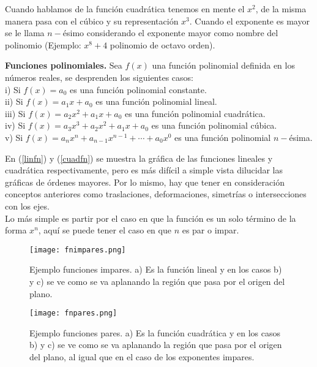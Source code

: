 Cuando hablamos de la función cuadrática tenemos en mente el $x^{2}$, de la misma manera pasa con el cúbico y su representación $x^{3}$. Cuando el exponente es mayor se le llama $n-$ésimo considerando el exponente mayor como nombre del polinomio (Ejemplo: $x^{8}+4$ polinomio de octavo orden). 

\begin{mydef}
\textbf{Funciones polinomiales.} Sea $f(x)$ una función polinomial definida en los números reales, se desprenden los siguientes casos:\\

\noindent i) Si $f(x)=a_{0}$ es una función polinomial constante.\\
\noindent ii) Si $f(x)=a_{1}x+a_{0}$ es una función polinomial lineal.\\
\noindent iii) Si $f(x)=a_{2}x^{2}+a_{1}x+a_{0}$ es una función polinomial cuadrática.\\
\noindent iv) Si $f(x)=a_{3}x^{3}+a_{2}x^{2}+a_{1}x+a_{0}$ es una función polinomial cúbica.\\
\noindent v) Si $f(x)=a_{n}x^{n}+a_{n-1}x^{n-1}+\cdots+a_{0}x^{0}$ es una función polinomial $n-$ésima.
\end{mydef}

En (\ref{linfn}) y (\ref{cuadfn}) se muestra la gráfica de las funciones lineales y cuadrática respectivamente, pero es más difícil a simple vista dilucidar las gráficas de órdenes mayores. Por lo mismo, hay que tener en consideración conceptos anteriores como traslaciones, deformaciones, simetrías o intersecciones con los ejes. \\

Lo más simple es partir por el caso en que la función es un solo término de la forma $x^{n}$, aquí se puede tener el caso en que $n$ es par o impar. \\

\begin{center}
\begin{figure}[h!]
\centering
\texttt{[image: fnimpares.png]}
\caption[Ejemplo funciones impares.]{Ejemplo funciones impares. a) Es la función lineal y en los casos b) y c) se ve como se va aplanando la región que pasa por el origen del plano.} \label{fnimp}
\end{figure}
\end{center}
 
 \begin{center}
\begin{figure}[h!]
\centering
\texttt{[image: fnpares.png]}
\caption[Ejemplo funciones pares.]{Ejemplo funciones pares. a) Es la función cuadrática y en los casos b) y c) se ve como se va aplanando la región que pasa por el origen del plano, al igual que en el caso de los exponentes impares.} \label{fnpar}
\end{figure}
\end{center}

